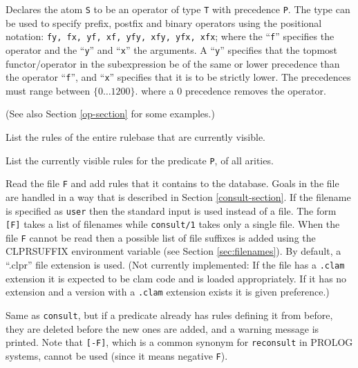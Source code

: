 \begin{description}
Declares the atom {\tt S} to be an operator of type {\tt T} 
with precedence {\tt P}.
The type can be used to specify prefix, postfix and binary operators
using the positional notation: {\tt fy, fx, yf, xf, yfy, xfy, yfx, xfx};
where the ``{\tt f}'' specifies the operator and 
the ``{\tt y}'' and ``{\tt x}'' the arguments.
A ``{\tt y}'' specifies that the topmost functor/operator in the subexpression
be of the same or lower precedence than the operator ``{\tt f}'', 
and ``{\tt x}'' specifies that it is to be strictly lower.
The precedences must range between $\{0 \ldots 1200\}$.
where a 0 precedence removes the operator.

(See also Section \ref{op-section} for some examples.)


List the rules of the entire rulebase that are currently visible.


List the currently visible rules for the predicate {\tt P}, of all arities.


\ouritem{{[+F]}}\index{{\tt [{$\cdots$}]}}
Read the file {\tt F} and add rules that it contains to the database. Goals in
the file are handled in a way that is described in 
Section \ref{consult-section}.
If the filename is specified as {\tt user} then the standard input
is used instead of a file.
\chgbarbegin
The form {\tt [F]} takes a list of filenames while {\tt consult/1} takes
only a single file.
When the file {\tt F} cannot be read then a possible list of file suffixes
is added using the CLPRSUFFIX environment variable 
(see Section \ref{sec:filenames}).
By default, a ``.clpr'' file extension is used.
(Not currently implemented: If the
file has a {\tt .clam} extension it is expected to be clam code and is loaded
appropriately. If it has no extension and a version with a {\tt .clam}
extension exists it is given preference.)
\chgbarend


\ouritem{{[`+F]}}\index{{\tt [`{$\cdots$}]}}
Same as {\tt consult}, but if a predicate already has rules
defining it from before, they are deleted before the new ones are added,
and a warning message is printed. Note
that {\tt [-F]}, which is a common synonym for {\tt reconsult} in PROLOG
systems, cannot be used (since it means negative {\tt F}).


\end{description}
